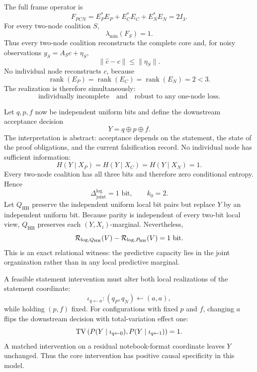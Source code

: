 
The full frame operator is
\[
F_{PCN}=E_P^*E_P+E_C^*E_C+E_N^*E_N=2I_3.
\]
For every two-node coalition \(S\),
\[
\lambda_{\min}(F_S)=1.
\]
Thus every two-node coalition reconstructs the complete core and, for noisy
observations \(y_S=A_Sc+\eta_S\),
\[
\|\widehat c-c\|
\leq
\|\eta_S\|.
\]
No individual node reconstructs \(c\), because
\[
\operatorname{rank}(E_P)
=
\operatorname{rank}(E_C)
=
\operatorname{rank}(E_N)
=2<3.
\]
The realization is therefore simultaneously:
\[
\text{individually incomplete}
\quad\text{and}\quad
\text{robust to any one-node loss}.
\]


Let \(q,p,f\) now be independent uniform bits and define the downstream
acceptance decision
\[
Y=q\oplus p\oplus f.
\]
The interpretation is abstract: acceptance depends on the statement, the state
of the proof obligations, and the current falsification record. No individual
node has sufficient information:
\[
H(Y\mid X_P)
=
H(Y\mid X_C)
=
H(Y\mid X_N)
=1.
\]
Every two-node coalition has all three bits and therefore zero conditional
entropy. Hence
\[
\boxed{
\Delta_{\mathrm{joint}}^{\log}=1\text{ bit},
\qquad
k_0=2.
}
\]
Let \(Q_{\mathrm{HH}}\) preserve the independent uniform local bit pairs but
replace \(Y\) by an independent uniform bit. Because parity is independent of
every two-bit local view, \(Q_{\mathrm{HH}}\) preserves each
\((Y,X_i)\)-marginal. Nevertheless,
\[
\mathcal R_{\log,Q_{\mathrm{HH}}}(V)
-
\mathcal R_{\log,P_{\mathrm{HH}}}(V)
=1\text{ bit}.
\]
This is an exact relational witness: the predictive capacity lies in the joint
organization rather than in any local predictive marginal.


A feasible statement intervention must alter both local realizations of the
statement coordinate:
\[
\iota_{q\leftarrow a}:
(q_P,q_N)\leftarrow(a,a),
\]
while holding \((p,f)\) fixed. For configurations with fixed \(p\) and \(f\),
changing \(a\) flips the downstream decision with total-variation effect one:
\[
\operatorname{TV}
\left(
P(Y\mid\iota_{q\leftarrow0}),
P(Y\mid\iota_{q\leftarrow1})
\right)
=1.
\]
A matched intervention on a residual notebook-format coordinate leaves \(Y\)
unchanged. Thus the core intervention has positive causal specificity in this
model.


